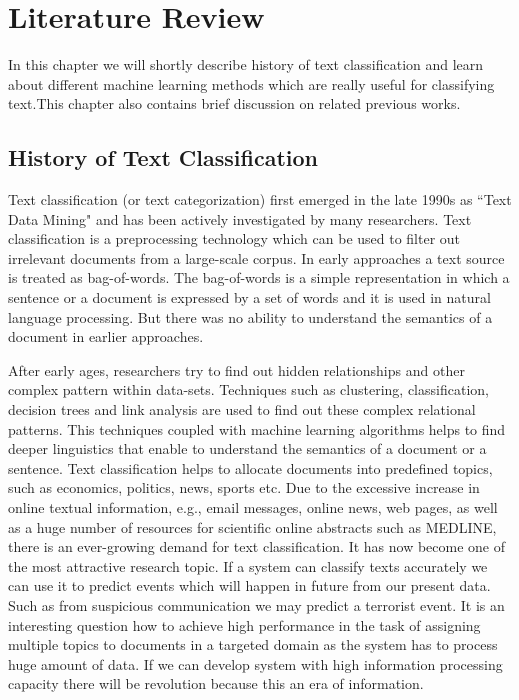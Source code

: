 \chapter{Literature Review}
\thispagestyle{empty}
In this chapter we will shortly describe history of text classification and learn about different machine learning methods which are really useful for classifying text.This chapter also contains brief discussion on related previous works.

\section{History of Text Classification}
Text classification (or text categorization)  first emerged in the late 1990s as ``Text Data Mining" and has been actively investigated by many researchers. Text classification is a preprocessing technology which can be used to filter out irrelevant documents from a large-scale corpus. In early approaches a text source is treated as bag-of-words. The bag-of-words is a simple representation in which a sentence or a document is expressed by a set of words and it is used in natural language processing. But there was no ability to understand the semantics of a document in earlier approaches.\par
\vspace{.5cm}
After early ages, researchers try to find out hidden relationships and other complex pattern within data-sets. Techniques such as clustering, classification, decision trees and link analysis are used to find out these complex relational patterns. This techniques coupled with machine learning algorithms helps to find deeper linguistics that enable to understand the semantics of a document or a sentence. Text classification helps to allocate documents into predefined topics, such as economics, politics, news, sports etc. Due to the excessive increase in online textual information, e.g., email messages, online news, web pages, as well as a huge number of resources for scientific online abstracts such as MEDLINE, there is an ever-growing demand for text classification. It has now become one of the most attractive research topic. If a system can classify texts accurately we can use it to predict events which will happen in future from our present data. Such as from suspicious communication we may predict a terrorist event. It is an interesting question how to achieve high performance in the task of assigning multiple topics to documents in a targeted domain as the system has to process huge amount of data. If we can develop system with high information processing capacity there will be revolution because this an era of information.


